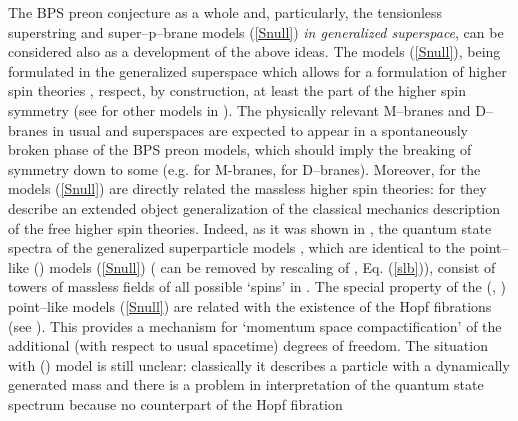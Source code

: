\documentclass[a4paper,11pt]{article}
\begin{document}
The BPS preon conjecture \cite{BPS01} as a whole and, particularly,  
the tensionless superstring and 
super--p--brane models (\ref{Snull}) {\sl in generalized 
superspace}, can be considered also as a development of the above ideas. 
The models (\ref{Snull}), being formulated in the generalized superspace 
which allows for a formulation of higher spin theories \cite{Fr86,V01s,V01c},  
respect, by construction, at least the \coordHE{} part of 
the higher spin symmetry 
(see \cite{ZL,ZU} for other models in \coordHE{}). 
The physically relevant M--branes and D--branes 
in usual \coordHE{} and \coordHE{} superspaces are expected to 
appear in a spontaneously broken phase
of the BPS preon models, which should imply the breaking 
of \coordHE{} symmetry down to some \coordHE{}
(e.g. \coordHE{} for M-branes, 
\coordHE{} for D--branes). 
Moreover, for \coordHE{} the models (\ref{Snull}) are directly related 
the \coordHE{} massless  higher spin theories: for \coordHE{}  they 
describe an extended object generalization of the 
classical mechanics description of 
the free higher spin theories. 
Indeed, as it was shown in 
\cite{BLS99}, 
 the quantum state spectra  of the \coordHE{} 
generalized superparticle models \cite{BL98}, which 
are identical to the 
point--like (\coordHE{})  
models (\ref{Snull}) 
(\coordHE{} can be removed by rescaling of  \myHighlight{$\lambda$}\coordHE{}, Eq. (\ref{slb})), 
consist of 
towers of massless fields of all possible `spins' in 
\coordHE{}. 
The special property of the  
\coordHE{} (\coordHE{}, \coordHE{}) point--like 
models (\ref{Snull}) are related with the existence of the Hopf fibrations 
\coordHE{} (see \cite{BLS99}). 
This provides a mechanism for `momentum space compactification' of 
the additional (with respect to usual spacetime) degrees of freedom. 
The situation with 
\coordHE{} (\coordHE{}) model is still unclear: 
classically it describes a particle with a dynamically generated mass 
\cite{BL98,BL98'} and there is a problem in interpretation of the 
quantum state spectrum because no counterpart of the Hopf fibration 
\end{document}

